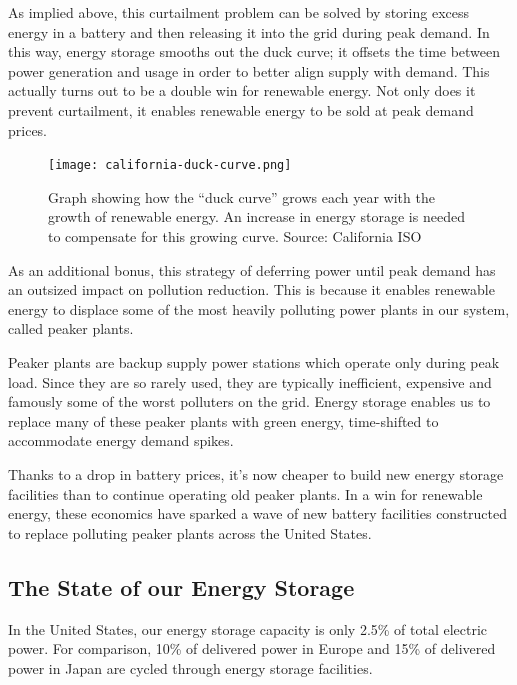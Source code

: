 \documentclass[hidelinks,12pt,a4paper]{article}
\begin{document}
As implied above, this curtailment problem can be solved by storing excess energy in a battery and then releasing it into the grid during peak demand. In this way, energy storage smooths out the duck curve; it offsets the time between power generation and usage in order to better align supply with demand. This actually turns out to be a double win for renewable energy. Not only does it prevent curtailment, it enables renewable energy to be sold at peak demand prices.

\begin{figure}[ht!]
    \centering
    \texttt{[image: california-duck-curve.png]}
    \caption{Graph showing how the “duck curve” grows each year with the growth of renewable energy. An increase in energy storage is needed to compensate for this growing curve. Source: California ISO \cite{UsingRenewablesToOperateLowCarbonGrid}}
\end{figure}
\FloatBarrier

As an additional bonus, this strategy of deferring power until peak demand has an outsized impact on pollution reduction. This is because it enables renewable energy to displace some of the most heavily polluting power plants in our system, called peaker plants.

Peaker plants are backup supply power stations which operate only during peak load. Since they are so rarely used, they are typically inefficient, expensive and famously some of the worst polluters on the grid. Energy storage enables us to replace many of these peaker plants with green energy, time-shifted to accommodate energy demand spikes.

Thanks to a drop in battery prices, it's now cheaper to build new energy storage facilities than to continue operating old peaker plants. In a win for renewable energy, these economics have sparked a wave of new battery facilities constructed to replace polluting peaker plants across the United States. \cite{StorageWillReplaceThreeCaliforniaGasPlants, NewYorkMovesToPhaseOutOlderPeakingPlants}

\subsection{The State of our Energy Storage}
In the United States, our energy storage capacity is only 2.5\% of total electric power. For comparison, 10\% of delivered power in Europe and 15\% of delivered power in Japan are cycled through energy storage facilities. \cite{USGridEnergyStorageFactsheet}
\end{document}
